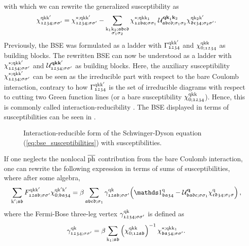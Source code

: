 \documentclass[../../main.tex]{subfiles}
\begin{document}
with which we can rewrite the generalized susceptibility as
\begin{align}\label{eq:bse_susceptibilities}
	\chi_{\mathfrak{1234};\sigma\sigma'}^{\text{q}\text{k}\text{k}'}=\chi_{\mathfrak{1234};\sigma\sigma'}^{*;\text{q}\text{k}\text{k}'}-\sum_{\substack{\text{k}_1\text{k}_2;\mathfrak{abcd}\\\sigma_1\sigma_2}}\chi_{\mathfrak{12ba};\sigma\sigma_1}^{*;\text{q}\text{k}\text{k}_1}\, \mathcal{U}^{\textbf{qk}_1\textbf{k}_2}_{\mathfrak{abcd};\sigma_1\sigma_2} \chi_{\mathfrak{dc34};\sigma_2\sigma'}^{\text{q}\text{k}_2\text{k}'}.
\end{align}
Previously, the BSE was formulated as a ladder with $\Gamma_{\mathfrak{1234}}^{\text{q}\text{k}\text{k}'}$ and $\chi_{0;\mathfrak{1234}}^{\text{q}\text{k}\text{k}}$ as building blocks. The rewritten BSE can now be understood as a ladder with $\chi_{\mathfrak{1234};\sigma\sigma'}^{*;\text{q}\text{k}\text{k}'}$ and $\mathcal{U}^{\textbf{qkk}'}_{\mathfrak{1234};\sigma\sigma'}$ as building blocks. Here, the auxiliary susceptibility $\chi_{\mathfrak{1234};\sigma\sigma'}^{*;\text{q}\text{k}\text{k}'}$ can be seen as the irreducible part with respect to the bare Coulomb interaction, contrary to how $\Gamma_{\mathfrak{1234}}^{\text{q}\text{k}\text{k}'}$ is the set of irreducible diagrams with respect to cutting two Green function lines (or a bare susceptibility $\chi_{0;\mathfrak{1234}}^{\text{q}\text{k}\text{k}}$). Hence, this is commonly called interaction-reducibility \cite{Krien2019a}. The BSE displayed in terms of susceptibilities can be seen in .
\begin{figure}[ht!]
	\centering
  	
  	\caption{Interaction-reducible form of the Schwinger-Dyson equation (\ref{eq:bse_susceptibilities}) with susceptibilities.}
  	\label{fig:bse_susceptibilities}
\end{figure}
If one neglects the nonlocal $\overline{\text{ph}}$ contribution from the bare Coulomb interaction, one can rewrite the following expression in terms of sums of susceptibilities, where after some algebra,
\begin{align}
	\sum_{\kp;\mathfrak{ab}}F_{\mathfrak{12ab};\ss'}^{\q\k\kp}\chi_{0;\mathfrak{ba34}}^{\q\kp\kp}=\beta\sum_{\mathfrak{abcd};\sigma_1}\gamma_{\mathfrak{12ab};\ss'}^{\q\k}\!\left (\unity_{\mathfrak{ba34}}^{\q}-\mathcal{U}^{\vv{q}}_{\mathfrak{badc};\ss_1}\chi^{\q}_{\mathfrak{cd34};\sigma_1\sigma}\right ),
\end{align}
where the Fermi-Bose three-leg vertex $\gamma_{\mathfrak{1234};\sigma\sigma'}^{\text{q}\text{k}}$ is defined as
\begin{align}\label{eq:vrg}
	\gamma_{\mathfrak{1234};\sigma\sigma'}^{\text{q}\text{k}} = \beta \sum_{\text{k}_1;\mathfrak{ab}}\left (\chi_{0;\mathfrak{12ab}}^{\text{q}\text{k}\text{k}}\right )^{-1}\chi_{\mathfrak{ba34};\sigma\sigma'}^{*;\text{q}\text{k}\text{k}_1}.
\end{align}
\end{document}
